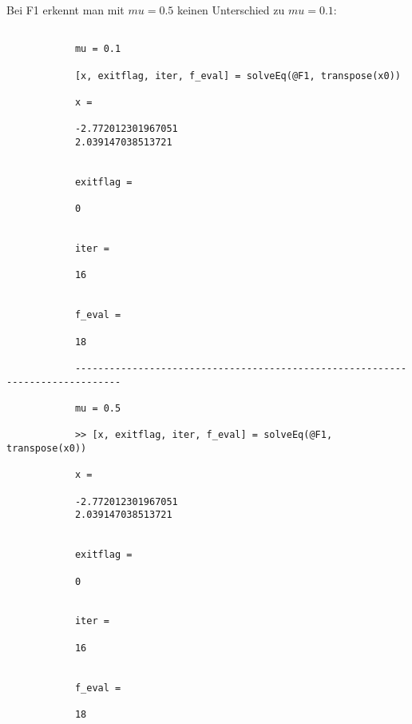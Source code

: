 \documentclass[11pt,titlepage]{article}
\begin{document}
		Bei F1 erkennt man mit $mu = 0.5$ keinen Unterschied zu $mu = 0.1$:
		\begin{lstlisting}
			
			mu = 0.1
			
			[x, exitflag, iter, f_eval] = solveEq(@F1, transpose(x0))
			
			x =
			
			-2.772012301967051
			2.039147038513721
			
			
			exitflag =
			
			0
			
			
			iter =
			
			16
			
			
			f_eval =
			
			18
			
			------------------------------------------------------------------------------
			
			mu = 0.5
			
			>> [x, exitflag, iter, f_eval] = solveEq(@F1, transpose(x0))
			
			x =
			
			-2.772012301967051
			2.039147038513721
			
			
			exitflag =
			
			0
			
			
			iter =
			
			16
			
			
			f_eval =
			
			18
			
			
		\end{lstlisting}
	
\end{document}
